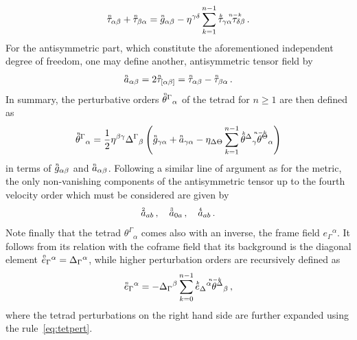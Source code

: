\documentclass[notitlepage,a4paper,aps,prd,onecolumn,superscriptaddress,nofootinbib,groupedaddress,longbibliography]{revtex4-1}
\newcommand{\order}[2]{\accentset{#2}{#1}}
\begin{document}
\begin{equation}
\order{\tau}{n}_{\alpha\beta} + \order{\tau}{n}_{\beta\alpha} = \order{g}{n}_{\alpha\beta} - \eta^{\gamma\delta}\sum_{k = 1}^{n - 1}\order{\tau}{k}_{\gamma\alpha}\order{\tau}{n-k}_{\delta\beta}\,.
\end{equation}
For the antisymmetric part, which constitute the aforementioned independent degree of freedom, one may define another, antisymmetric tensor field by
\begin{equation}
\order{a}{n}_{\alpha\beta} = 2\order{\tau}{n}_{[\alpha\beta]} = \order{\tau}{n}_{\alpha\beta} - \order{\tau}{n}_{\beta\alpha}\,.
\end{equation}
In summary, the perturbative orders \(\order{\theta}{n}^{\Gamma}{}_{\alpha}\) of the tetrad for \(n \geq 1\) are then defined as
\begin{equation}\label{eq:tetpert}
\order{\theta}{n}^{\Gamma}{}_{\alpha} = \frac{1}{2}\eta^{\beta\gamma}\Delta^{\Gamma}{}_{\beta}\left(\order{g}{n}_{\gamma\alpha} + \order{a}{n}_{\gamma\alpha} - \eta_{\Delta\Theta}\sum_{k = 1}^{n - 1}\order{\theta}{k}^{\Delta}{}_{\gamma}\order{\theta}{n-k}^{\Theta}{}_{\alpha}\right)
\end{equation}
in terms of \(\order{g}{n}_{\alpha\beta}\) and \(\order{a}{n}_{\alpha\beta}\). Following a similar line of argument as for the metric, the only non-vanishing components of the antisymmetric tensor up to the fourth velocity order which must be considered are given by
\begin{equation}
\order{a}{2}_{ab}\,, \quad
\order{a}{3}_{0a}\,, \quad
\order{a}{4}_{ab}\,.
\end{equation}
Note finally that the tetrad \(\theta^{\Gamma}{}_{\alpha}\) comes also with an inverse, the frame field \(e_{\Gamma}{}^{\alpha}\). It follows from its relation with the coframe field that its background is the diagonal element \(\order{e}{0}_{\Gamma}{}^{\alpha} = \Delta_{\Gamma}{}^{\alpha}\), while higher perturbation orders are recursively defined as
\begin{equation}\label{eq:invtetpert}
\order{e}{n}_{\Gamma}{}^{\alpha} = -\Delta_{\Gamma}{}^{\beta}\sum_{k = 0}^{n - 1}\order{e}{k}_{\Delta}{}^{\alpha}\order{\theta}{n-k}^{\Delta}{}_{\beta}\,,
\end{equation}
where the tetrad perturbations on the right hand side are further expanded using the rule~\eqref{eq:tetpert}.
\end{document}
